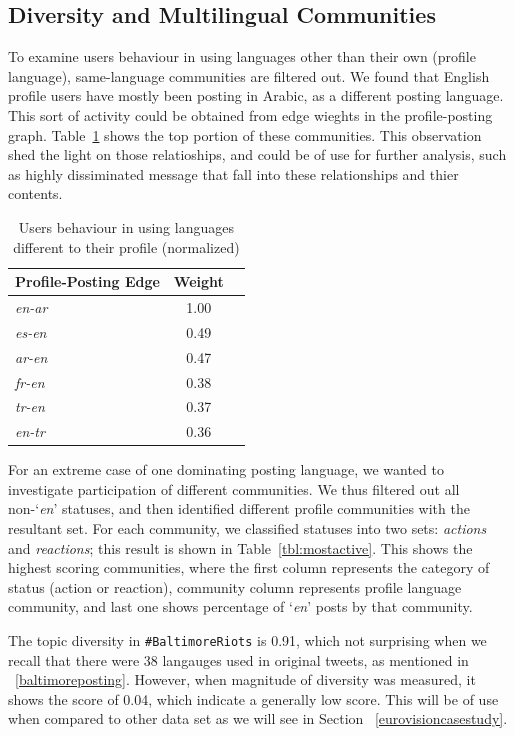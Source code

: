 \subsection{Diversity and Multilingual Communities}

To examine users behaviour in using languages other than their 
own (profile language), same-language communities are filtered out.
We found that English profile users have mostly been posting in Arabic, as a 
different posting language. This sort of activity could be obtained from edge 
wieghts in the profile-posting graph. Table~\ref{tbl:baltimoredifflang} shows 
the top portion of these communities. This observation shed the light on those 
relatioships, and could be of use for further analysis, such as highly dissiminated 
message that fall into these relationships and thier contents. 

\begin{table}[!htb]
\centering
\begin{tabular}{@{}lcr@{}}
\toprule
\textbf{Profile-Posting Edge} & \textbf{Weight} \\ \midrule
{\emph{en-ar}} & 1.00 \\
{\emph{es-en}} & 0.49 \\
{\emph{ar-en}} & 0.47\\ 
{\emph{fr-en}} & 0.38 \\
{\emph{tr-en}} & 0.37 \\
{\emph{en-tr}} & 0.36 \\ \bottomrule
\end{tabular}
\caption{Users behaviour in using languages different to their profile (normalized)}
\label{tbl:baltimoredifflang}
\end{table}

For an extreme case of one dominating posting language, we wanted to
investigate participation of different communities. We thus filtered
out all non-`{\emph{en}}' statuses, and then identified different
profile communities with the resultant set. For each community, we
classified statuses into two sets: {\emph{actions}} and
{\emph{reactions}}; this result is shown in
Table~\ref{tbl:mostactive}. This shows the highest scoring
communities, where the first column represents the category of status
(action or reaction), community column represents profile language
community, and last one shows percentage of `{\emph{en}}' posts by
that community.

The topic diversity in  {\texttt{\#BaltimoreRiots}} is 0.91, which not surprising 
when we recall that there were 38 langauges used in original tweets, as mentioned in 
~\ref{baltimoreposting}. However, when magnitude of diversity was measured, 
it shows the score of 0.04, which indicate a generally low score. This will be of use
when compared to other data set as we will see in Section ~\ref{eurovisioncasestudy}.

